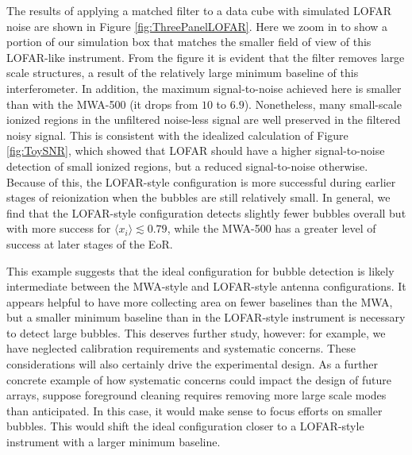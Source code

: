 The results of applying a matched filter to a data cube with simulated
LOFAR noise are shown in Figure \ref{fig:ThreePanelLOFAR}. Here we zoom in to show a portion of our simulation box that matches the smaller field of view of this LOFAR-like instrument. 
From the figure it
is evident that the filter removes large scale structures, a result
of the relatively large minimum baseline of this interferometer.
In addition, the maximum signal-to-noise achieved here is smaller
than with the MWA-500 (it drops from $10$ to $6.9$). Nonetheless, many
small-scale ionized regions in the unfiltered noise-less signal are
well preserved in the filtered noisy signal. This is consistent
with the idealized calculation of
Figure \ref{fig:ToySNR}, which showed that LOFAR should have
a higher signal-to-noise detection of small ionized regions, but
a reduced signal-to-noise otherwise. Because of this, the LOFAR-style
configuration is more successful during earlier stages of reionization
when the bubbles are still relatively small. In general, we find
that the LOFAR-style configuration detects slightly fewer bubbles overall
but with more success for $\langle x_i \rangle \lesssim 0.79$, while the MWA-500
has a greater level of success at later stages of the EoR.

This example suggests that the ideal configuration for bubble
detection is likely intermediate between the MWA-style and LOFAR-style
antenna configurations. It appears helpful to have more collecting
area on fewer baselines than the MWA, but a smaller minimum baseline
than in the LOFAR-style instrument is necessary to detect large
bubbles.  This deserves further study, however: for example, we have
neglected calibration requirements and systematic concerns. These
considerations will also certainly drive the experimental
design. As a further concrete example of how systematic concerns
could impact the design of future arrays, suppose 
foreground cleaning requires removing more
large scale modes than anticipated. In this case, it would make sense to focus
efforts on smaller bubbles.
This would shift the ideal configuration closer to a
LOFAR-style instrument with a larger minimum baseline.


